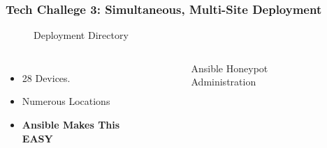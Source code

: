 \begin{frame}
\frametitle{Tech Challege 3: Simultaneous, Multi-Site Deployment}

\begin{figure}[b]
\vspace{-5mm}
\caption*{Deployment Directory}
\end{figure}

\begin{columns}
\vspace{-20mm}
\begin{itemize}
    \item 28 Devices.
    \item Numerous Locations
    \item{\textbf{Ansible Makes This EASY}}
\end{itemize}

\vspace{-5mm}
\begin{figure}[b]

{\caption*{Ansible Honeypot Administration}}
\end{figure}

\end{columns}

\end{frame}
